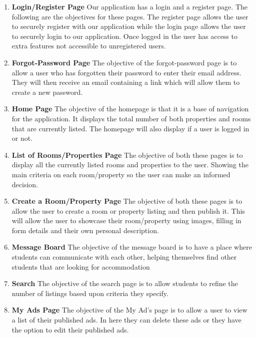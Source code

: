 \begin{enumerate}
    \item \textbf{Login/Register Page} Our application has a login and a register page. The following are the objectives for these pages. The register page allows the user to securely register with our application while the login page allows the user to securely login to our application. Once logged in the user has access to extra features not accessible to unregistered users. 
    
    \item \textbf{Forgot-Password Page}
    The objective of the forgot-password page is to allow a user who has forgotten their password to enter their email address. They will then receive an email containing a link which will allow them to create a new password.

    \item \textbf{Home Page} 
    The objective of the homepage is that it is a base of navigation for the application. It displays the total number of both properties and rooms that are currently listed. The homepage will also display if a user is logged in or not.
    
    \item \textbf{List of Rooms/Properties Page} 
    The objective of both these pages is to display all the currently listed rooms and properties to the user. Showing the main criteria on each room/property so the user can make an informed decision.
    
    \item \textbf{Create a Room/Property Page} 
    The objective of both these pages is to allow the user to create a room or property listing and then publish it. This will allow the user to showcase their room/property using images, filling in form details and their own personal description.
    
    \item \textbf{Message Board} 
    The objective of the message board is to have a place where students can communicate with each other, helping themselves find other students that are looking for accommodation
    
    \item \textbf{Search} 
    The objective of the search page is to allow students to refine the number of listings based upon criteria they specify. 
    
    \item \textbf{My Ads Page}
    The objective of the My Ad’s page is to allow a user to view a list of their published ads. In here they can delete these ads or they have the option to edit their published ads.
\end{enumerate}

